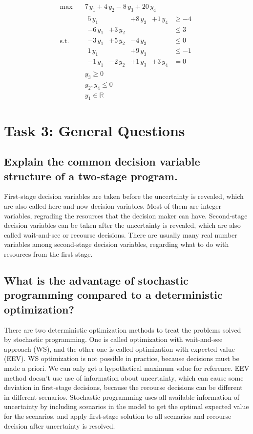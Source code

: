 \documentclass[fleqn,10pt]{wlscirep}
\begin{document}
\begin{align}
    \max \quad& 7 \,  y_1 + 4 \,  y_2 - 8 \,  y_3 + 20 \,  y_4 \\
    \text{s.t.} \quad& \begin{array}{rrrrl}
        5 \,  y_1 & &+ 8 \,  y_3 &+ 1 \,  y_4 &\geq - 4 \\
        - 6 \, y_1 &+ 3 \,  y_2 & & & \leq 3 \\
        - 3 \,  y_1 &+ 5 \, y_2 &- 4 \,  y_3 & & \leq 0  \\
        1 \,  y_1 & & + 9 \, y_3 & & \leq - 1 \\
        - 1 \,  y_1 & -2 \, y_2 &+ 1 \, y_3 &+ 3 \,  y_4 & = 0
    \end{array} \\
    \quad & y_3 \geq 0 \\
    \quad & y_2,  y_4 \leq 0 \\
    \quad & y_1 \in \mathbb{R}
\end{align}

\section{Task 3: General Questions}

\subsection{Explain the common decision variable structure of a two-stage program.}

First-stage decision variables are taken before the uncertainty is revealed, which are also called here-and-now decision variables. Most of them are integer variables, regrading the resources that the decision maker can have. Second-stage decision variables can be taken after the uncertainty is revealed, which are also called wait-and-see or recourse decisions. There are usually many real number variables among second-stage decision variables, regarding what to do with resources from the first stage.

\subsection{What is the advantage of stochastic programming compared to a deterministic optimization?}

There are two deterministic optimization methods to treat the problems solved by stochastic programming. One is called optimization with wait-and-see approach (WS), and the other one is called optimization with expected value (EEV). WS optimization is not possible in practice, because decisions must be made a priori. We can only get a hypothetical maximum value for reference. EEV method doesn't use use of information about uncertainty, which can cause some deviation in first-stage decisions, because the recourse decisions can be different in different scenarios. Stochastic programming uses all available information of uncertainty by including scenarios in the model to get the optimal expected value for the scenarios, and apply first-stage solution to all scenarios and recourse decision after uncertainty is resolved.
\end{document}
